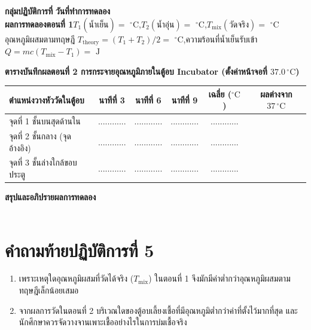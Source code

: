 \begin{worksheetbox}
\noindent\textbf{กลุ่มปฏิบัติการที่} \dotfill \textbf{วันที่ทำการทดลอง} \dotfill\\[4pt]
\noindent\textbf{ผลการทดลองตอนที่ 1}\quad $T_1 (\text{น้ำเย็น}) = $ \dotfill $^\circ\text{C}$,\quad $T_2 (\text{น้ำอุ่น}) = $ \dotfill $^\circ\text{C}$,\quad $T_{\text{mix}} (\text{วัดจริง}) = $ \dotfill $^\circ\text{C}$\\[4pt]
อุณหภูมิผสมตามทฤษฎี $T_{\text{theory}} = (T_1 + T_2)/2 = $ \dotfill $^\circ\text{C}$,\quad ความร้อนที่น้ำเย็นรับเข้า $Q = mc(T_{\text{mix}}-T_1) = $ \dotfill $\text{J}$

\vspace{6pt}
\noindent\textbf{ตารางบันทึกผลตอนที่ 2 การกระจายอุณหภูมิภายในตู้อบ Incubator (ตั้งค่าหน้าจอที่ $37.0\,^\circ\text{C}$)}
\begin{center}
\footnotesize\setlength{\tabcolsep}{3.5pt}
\begin{tabularx}{\linewidth}{>{\raggedright\arraybackslash}X c c c c c}
\toprule
\textbf{ตำแหน่งวางหัววัดในตู้อบ} & \textbf{นาทีที่ 3} & \textbf{นาทีที่ 6} & \textbf{นาทีที่ 9} & \textbf{เฉลี่ย ($^\circ\text{C}$)} & \textbf{ผลต่างจาก $37\,^\circ\text{C}$} \\
\midrule
จุดที่ 1 ชั้นบนสุดด้านใน & ............ & ............ & ............ & ............ & \dotfill \\
จุดที่ 2 ชั้นกลาง (จุดอ้างอิง) & ............ & ............ & ............ & ............ & \dotfill \\
จุดที่ 3 ชั้นล่างใกล้ขอบประตู & ............ & ............ & ............ & ............ & \dotfill \\
\bottomrule
\end{tabularx}
\end{center}

\vspace{4pt}
\noindent\textbf{สรุปและอภิปรายผลการทดลอง}\\[4pt]
\dotfill\\[6pt]
\dotfill
\end{worksheetbox}

\section*{คำถามท้ายปฏิบัติการที่ 5}
\begin{enumerate}
    \item เพราะเหตุใดอุณหภูมิผสมที่วัดได้จริง ($T_{\text{mix}}$) ในตอนที่ 1 จึงมักมีค่าต่ำกว่าอุณหภูมิผสมตามทฤษฎีเล็กน้อยเสมอ
    \item จากผลการวัดในตอนที่ 2 บริเวณใดของตู้อบเลี้ยงเชื้อที่มีอุณหภูมิต่ำกว่าค่าที่ตั้งไว้มากที่สุด และนักศึกษาควรจัดวางจานเพาะเชื้ออย่างไรในการบ่มเชื้อจริง
\end{enumerate}
